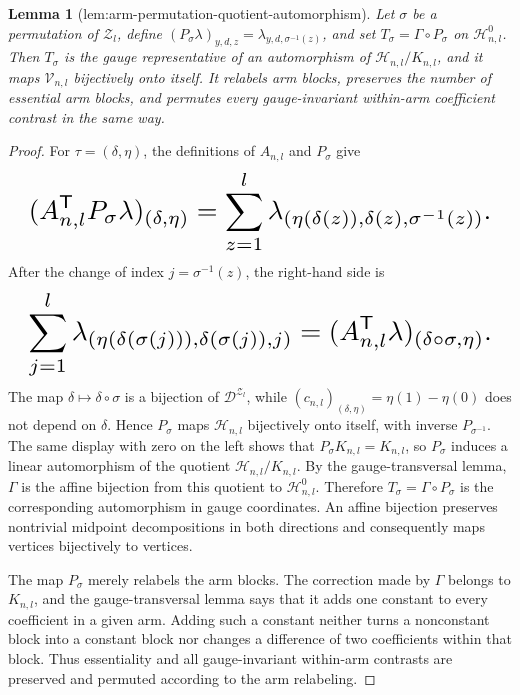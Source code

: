 \documentclass{article}
\newtheorem{lemma}{Lemma}
\begin{document}
\begin{lemma}[lem:arm-permutation-quotient-automorphism]\label{lem:arm-permutation-quotient-automorphism}
Let \(\sigma\) be a permutation of \(\mathcal Z_l\), define \((P_\sigma\lambda)_{y,d,z}=\lambda_{y,d,\sigma^{-1}(z)}\), and set \(T_\sigma=\Gamma\circ P_\sigma\) on \(\mathcal H^0_{n,l}\). Then \(T_\sigma\) is the gauge representative of an automorphism of \(\mathcal H_{n,l}/K_{n,l}\), and it maps \(\mathcal V_{n,l}\) bijectively onto itself. It relabels arm blocks, preserves the number of essential arm blocks, and permutes every gauge-invariant within-arm coefficient contrast in the same way.
\end{lemma}
\begin{proof}
For \(\tau=(\delta,\eta)\), the definitions of \(A_{n,l}\) and \(P_\sigma\) give
\[
\makebox[\linewidth][c]{\resizebox{0.98\linewidth}{!}{\par\noindent \makebox[\linewidth][c]{\resizebox{0.98\linewidth}{!}{\(\displaystyle \displaystyle (A_{n,l}^{\mathsf T}P_\sigma\lambda)_{(\delta,\eta)}=\sum_{z=1}^l\lambda_{(\eta(\delta(z)),\delta(z),\sigma^{-1}(z))}.\)}}\par\noindent}}
\]
After the change of index \(j=\sigma^{-1}(z)\), the right-hand side is
\[
\makebox[\linewidth][c]{\resizebox{0.98\linewidth}{!}{\par\noindent \makebox[\linewidth][c]{\resizebox{0.98\linewidth}{!}{\(\displaystyle \displaystyle \sum_{j=1}^l\lambda_{(\eta(\delta(\sigma(j))),\delta(\sigma(j)),j)}=(A_{n,l}^{\mathsf T}\lambda)_{(\delta\circ\sigma,\eta)}.\)}}\par\noindent}}
\]
The map \(\delta\mapsto\delta\circ\sigma\) is a bijection of \(\mathcal D^{\mathcal Z_l}\), while \((c_{n,l})_{(\delta,\eta)}=\eta(1)-\eta(0)\) does not depend on \(\delta\). Hence \(P_\sigma\) maps \(\mathcal H_{n,l}\) bijectively onto itself, with inverse \(P_{\sigma^{-1}}\). The same display with zero on the left shows that \(P_\sigma K_{n,l}=K_{n,l}\), so \(P_\sigma\) induces a linear automorphism of the quotient \(\mathcal H_{n,l}/K_{n,l}\). By the gauge-transversal lemma, \(\Gamma\) is the affine bijection from this quotient to \(\mathcal H^0_{n,l}\). Therefore \(T_\sigma=\Gamma\circ P_\sigma\) is the corresponding automorphism in gauge coordinates. An affine bijection preserves nontrivial midpoint decompositions in both directions and consequently maps vertices bijectively to vertices.

The map \(P_\sigma\) merely relabels the arm blocks. The correction made by \(\Gamma\) belongs to \(K_{n,l}\), and the gauge-transversal lemma says that it adds one constant to every coefficient in a given arm. Adding such a constant neither turns a nonconstant block into a constant block nor changes a difference of two coefficients within that block. Thus essentiality and all gauge-invariant within-arm contrasts are preserved and permuted according to the arm relabeling.
\end{proof}
\end{document}
